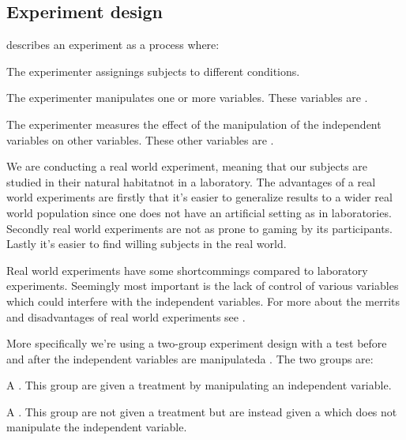 \subsection{Experiment design}
\label{section:empirical.methodology.experiment.design}

\citet[]{robson93} describes an experiment as a process where:


\begin{items}
  \item The experimenter assignings subjects to different conditions.
  \item The experimenter manipulates one or more variables.
    These variables are .
  \item The experimenter measures the effect of the manipulation of
    the independent variables on other variables. These other
    variables are .
\end{items}

We are conducting a real world experiment, meaning that our subjects
are studied in their natural habitat\dash{}not in a laboratory.
The advantages of a real world experiments are firstly that it's easier to
generalize results to a wider real world population since one does not have
an artificial setting as in laboratories. Secondly real world experiments are
not as prone to gaming by its participants. Lastly it's easier to find willing
subjects in the real world.

Real world experiments have some shortcommings compared to laboratory
experiments. Seemingly most important is the lack of control of various
variables which could interfere with the independent variables.
For more about the merrits and disadvantages of real world experiments
see \citet[]{robson93}.

More specifically we're using a two-group experiment design with a test before
and after the independent variables are manipulated\dash{}a .
The two groups are:

\begin{items}
  \item A . This group are given a treatment by
    manipulating an independent variable.
  \item A . This group are not given a treatment but are
    instead given a  which does not manipulate the independent
    variable.
\end{items}

